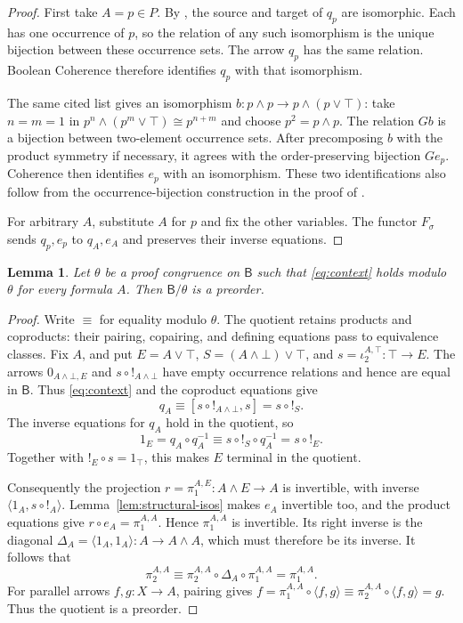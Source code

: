 \documentclass[11pt]{article}
\newtheorem{lemma}[theorem]{Lemma}
\newcommand{\B}{\mathsf B}
\begin{document}
\begin{proof}
First take $A=p\in P$. By \cite[\S12.5, p.~294]{DP}, the source
and target of $q_p$ are isomorphic. Each has one occurrence of $p$,
so the relation of any such isomorphism is the unique bijection
between these occurrence sets. The arrow $q_p$ has the same relation.
Boolean Coherence therefore identifies $q_p$ with that isomorphism.

The same cited list gives an isomorphism
$b:p\wedge p\to p\wedge(p\vee\top)$: take $n=m=1$ in
$p^n\wedge(p^m\vee\top)\cong p^{n+m}$ and choose $p^2=p\wedge p$.
The relation $Gb$ is a bijection between two-element occurrence sets.
After precomposing $b$ with the product symmetry if necessary, it
agrees with the order-preserving bijection $Ge_p$. Coherence then
identifies $e_p$ with an isomorphism. These two identifications also
follow from the occurrence-bijection construction in the proof of
\cite[Lemma~7]{DPIsomorphic}.

For arbitrary $A$, substitute $A$ for $p$ and fix the other variables.
The functor $F_\sigma$ sends $q_p,e_p$ to $q_A,e_A$ and preserves
their inverse equations.
\end{proof}

\begin{lemma}\label{lem:collapse}
Let $\theta$ be a proof congruence on $\B$ such that
\eqref{eq:context} holds modulo $\theta$ for every formula $A$.
Then $\B/\theta$ is a preorder.
\end{lemma}

\begin{proof}
Write $\equiv$ for equality modulo $\theta$.
The quotient retains products and coproducts: their pairing,
copairing, and defining equations pass to equivalence classes.
Fix $A$, and put
$E=A\vee\top$, $S=(A\wedge\bot)\vee\top$, and
$s=\iota_2^{A,\top}:\top\to E$.
The arrows $0_{A\wedge\bot,E}$ and $s\circ!_{A\wedge\bot}$ have
empty occurrence relations and hence are equal in $\B$. Thus
\eqref{eq:context} and the coproduct equations give
\[
 q_A\equiv[s\circ!_{A\wedge\bot},s]=s\circ!_S.
\]
The inverse equations for $q_A$ hold in the quotient, so
\[
 1_E=q_A\circ q_A^{-1}
    \equiv s\circ!_S\circ q_A^{-1}=s\circ!_E.
\]
Together with $!_E\circ s=1_\top$, this makes $E$ terminal in the
quotient.

Consequently the projection
$r=\pi_1^{A,E}:A\wedge E\to A$ is invertible, with inverse
$\langle1_A,s\circ!_A\rangle$.
Lemma~\ref{lem:structural-isos} makes $e_A$ invertible too, and the
product equations give
$r\circ e_A=\pi_1^{A,A}$.
Hence $\pi_1^{A,A}$ is invertible. Its right inverse is the diagonal
$\Delta_A=\langle1_A,1_A\rangle:A\to A\wedge A$, which must
therefore be its inverse. It follows that
\[
 \pi_2^{A,A}
   \equiv\pi_2^{A,A}\circ\Delta_A\circ\pi_1^{A,A}
   =\pi_1^{A,A}.
\]
For parallel arrows $f,g:X\to A$, pairing gives
$f=\pi_1^{A,A}\circ\langle f,g\rangle
 \equiv\pi_2^{A,A}\circ\langle f,g\rangle=g$.
Thus the quotient is a preorder.
\end{proof}
\end{document}
